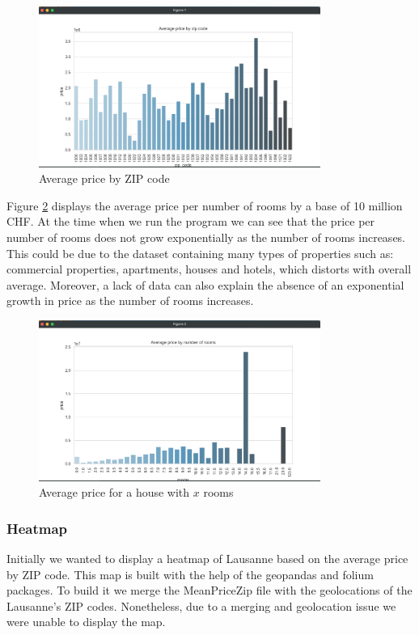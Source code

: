 \documentclass[main]{subfiles}
\begin{document}
\begin{figure}[htbp]
    \centerline{
        \includegraphics[width = 92mm]{prog_11.png}}
    \caption{Average price by ZIP code}
    \label{fig:pricebyzip}
\end{figure}


Figure \ref{fig:pricebyrooms} displays the average price per number of rooms by a base of 10 million CHF. 
At the time when we run the program we can see that the price per number of rooms does not grow exponentially as the number of rooms increases.
This could be due to the dataset containing many types of properties such as: commercial properties, apartments, houses and hotels, 
which distorts with overall average. 
Moreover, a lack of data can also explain the absence of an exponential growth in price as the number of rooms increases.

\begin{figure}[htbp]
    \centerline{
        \includegraphics[width = 92mm]{prog_12.png}}
    \caption{Average price for a house with $x$ rooms}
    \label{fig:pricebyrooms}
\end{figure}

\subsubsection{Heatmap}
Initially we wanted to display a heatmap of Lausanne based on the average price by ZIP code. 
This map is built with the help of the geopandas and folium packages. 
To build it we merge the MeanPriceZip file with the geolocations of the Lausanne's ZIP codes. Nonetheless, 
due to a merging and geolocation issue we were unable to display the map. 
\end{document}
